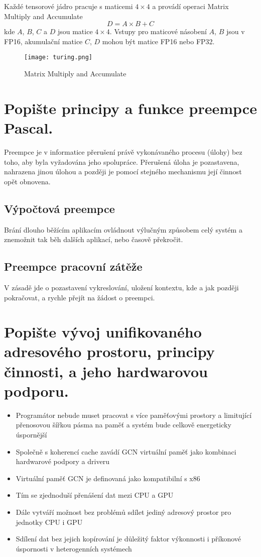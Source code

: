 	Každé tensorové jádro pracuje s maticemi $4 \times 4$ a provádí operaci Matrix Multiply and Accumulate
	$$D = A \times B + C$$
	kde $A$, $B$, $C$ a $D$ jsou matice $4 \times 4$.
	Vstupy pro maticové násobení $A$, $B$ jsou v FP16, akumulační matice $C$, $D$ mohou být matice FP16 nebo FP32.
	\begin{figure}[h]
		\centering
		\texttt{[image: turing.png]}
		\caption{Matrix Multiply and Accumulate}
		\label{fig:turing}
	\end{figure}
	

\section{Popište principy a funkce preempce Pascal.}
	\label{sec:preempce}
	Preempce je v informatice přerušení právě vykonávaného procesu (úlohy) bez toho, aby byla vyžadována jeho spolupráce. Přerušená úloha je pozastavena, nahrazena jinou úlohou a později je pomocí stejného mechanismu její činnost opět obnovena.

	\subsection*{Výpočtová preempce}
		Brání dlouho běžícím aplikacím ovládnout výlučným způsobem celý systém a znemožnit tak běh dalších aplikací, nebo časově překročit.
	
	\subsection*{Preempce pracovní zátěže}
		V zásadě jde o pozastavení vykreslování, uložení kontextu, kde a jak později pokračovat, a rychle přejít na žádost o preempci.

	
\section{Popište vývoj unifikovaného adresového prostoru, principy činnosti, a jeho hardwarovou podporu.}
	\begin{itemize}
		\setlength\itemsep{0em}
		\item Programátor nebude muset pracovat s více paměťovými prostory a limitující přenosovou šířkou pásma na paměť a systém bude celkově energeticky úspornější
		\item Společně s koherencí cache zavádí GCN virtuální paměť jako kombinaci hardwarové podpory a driveru
		\item Virtuální paměť GCN je definovaná jako kompatibilní s x86
		\item Tím se zjednoduší přenášení dat mezi CPU a GPU
		\item Dále vytváří možnost bez problémů sdílet jediný adresový prostor pro jednotky CPU i GPU
		\item Sdílení dat bez jejich kopírování je důležitý faktor výkonnosti i příkonové úspornosti v heterogenních systémech
	\end{itemize}
	
